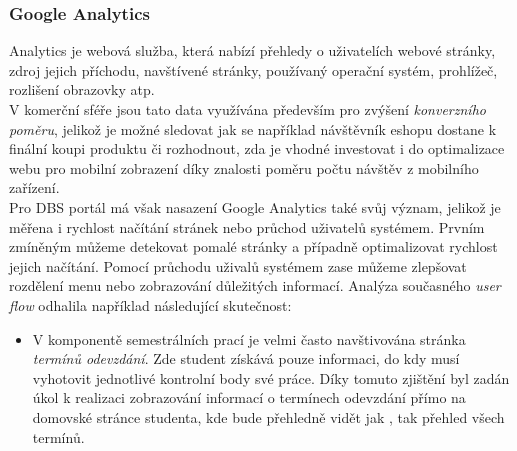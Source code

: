 \subsubsection{Google Analytics}

Analytics \cite{ga} je webová služba, která nabízí přehledy o uživatelích webové stránky, zdroj jejich příchodu, navštívené stránky, používaný operační systém, prohlížeč, rozlišení obrazovky atp.\\
V komerční sféře jsou tato data využívána především pro zvýšení \emph{konverzního poměru}, jelikož je možné sledovat jak se například návštěvník eshopu dostane k finální koupi produktu či rozhodnout, zda je vhodné investovat i do optimalizace webu pro mobilní zobrazení díky znalosti poměru počtu návštěv z mobilního zařízení.\\
Pro DBS portál má však nasazení Google Analytics také svůj význam, jelikož je měřena i rychlost načítání stránek nebo průchod uživatelů systémem. Prvním zmíněným můžeme detekovat pomalé stránky a případně optimalizovat rychlost jejich načítání. Pomocí průchodu uživalů systémem zase můžeme zlepšovat rozdělení menu nebo zobrazování důležitých informací. Analýza současného \emph{user flow} odhalila například následující skutečnost:
\begin{itemize}
	\item V komponentě semestrálních prací je velmi často navštivována stránka \emph{termínů odevzdání}. Zde student získává pouze informaci, do kdy musí vyhotovit jednotlivé kontrolní body své práce. Díky tomuto zjištění byl zadán úkol k realizaci zobrazování informací o termínech odevzdání přímo na domovské stránce studenta, kde bude přehledně vidět jak , tak přehled všech termínů.
\end{itemize}

